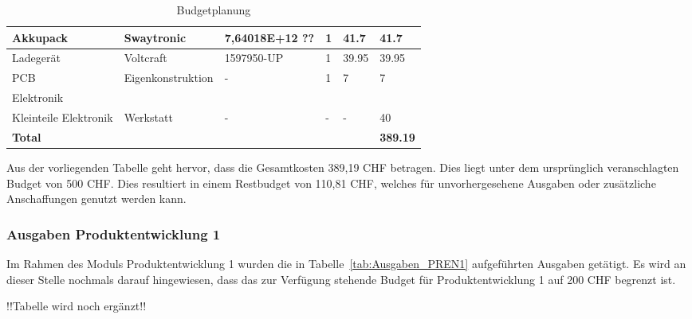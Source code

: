 \documentclass[main.tex]{subfiles} %
\begin{document}
\begin{table}[h]
\begin{tabular}{|p{3cm}|p{3cm}|p{3cm}|p{1cm}|p{1.5cm}|p{1cm}|}
        Akkupack                               & Swaytronic          & 7,64018E+12 ??          & 1               & 41.7                      & 41.7                        \\ \hline
        Ladegerät                              & Voltcraft           & 1597950-UP              & 1               & 39.95                     & 39.95                       \\ \hline
        PCB                                    & Eigenkonstruktion   & -                       & 1               & 7                         & 7                           \\ \hline
        \rowcolor{lightgray} Elektronik        &                     &                         &                 &                           &                             \\ \hline
        Kleinteile Elektronik                  & Werkstatt           & -                       & -               & -                         & 40                          \\ \hline
        \textbf{Total}                         &                     &                         &                 &                           & \textbf{389.19}                \\ \hline
    \end{tabular}
    \caption{Budgetplanung}
    \label{tab:Budgetplanung}
\end{table}

Aus der vorliegenden Tabelle geht hervor, dass die Gesamtkosten 389,19 CHF betragen.
Dies liegt unter dem ursprünglich veranschlagten Budget von 500 CHF. 
Dies resultiert in einem Restbudget von 110,81 CHF, welches für unvorhergesehene Ausgaben oder zusätzliche
Anschaffungen genutzt werden kann.

\subsubsection{Ausgaben Produktentwicklung 1}
Im Rahmen des Moduls Produktentwicklung 1 wurden die in
Tabelle~\ref{tab:Ausgaben_PREN1} aufgeführten Ausgaben getätigt. Es wird 
an dieser Stelle nochmals darauf hingewiesen, dass das zur Verfügung stehende 
Budget für Produktentwicklung 1 auf 200 CHF begrenzt ist.

!!Tabelle wird noch ergänzt!!
\newpage
\end{document}
